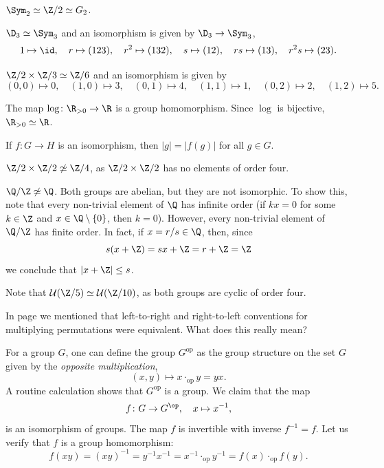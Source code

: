 \begin{example}
$\Sym_2\simeq\Z/2\simeq G_2$.
\end{example}

\begin{example}
$\D_3\simeq\Sym_3$ and an isomorphism is given by $\D_3\to\Sym_3$,
\[
1\mapsto \id,\quad
r\mapsto (123),\quad r^2\mapsto(132),\quad s\mapsto(12),\quad rs\mapsto(13),\quad r^2s\mapsto(23).
\]
\end{example}

\begin{example}
$\Z/2\times\Z/3\simeq\Z/6$ and an isomorphism is given by 
\[
(0,0)\mapsto 0,\quad (1,0)\mapsto 3,\quad
(0,1)\mapsto 4,\quad (1,1)\mapsto 1,\quad (0,2)\mapsto 2,\quad (1,2)\mapsto 5.
\]
\end{example}

\begin{example}
The map $\log\colon\R_{>0}\to\R$ is a group homomorphism. Since
$\log$ is bijective, 
$\R_{>0}\simeq\R$.
\end{example}

If $f\colon G\to H$ is an isomorphism, then
$|g|=|f(g)|$ for all $g\in G$. 

\begin{example}
\label{exa:order4}
$\Z/2\times\Z/2\not\simeq\Z/4$, as $\Z/2\times\Z/2$ has no elements of order four. 
\end{example}

\begin{example}
$\Q/\Z\not\simeq\Q$. Both groups are abelian, but they are not isomorphic. To show this, note that every non-trivial element of $\Q$ has infinite order (if $kx=0$ for some $k\in\Z$ and $x\in\Q\setminus\{0\}$, then
$k=0$). However, every non-trivial element of $\Q/\Z$ has finite order. In fact, if $x=r/s\in\Q$, then, since 
\[
s(x+\Z)=sx+\Z=r+\Z=\Z
\]
we conclude that $|x+\Z|\leq s$.
\end{example}

\begin{example}
\label{exa:U(Z/5)}
Note that $\mathcal{U}(\Z/5)\simeq\mathcal{U}(\Z/10)$, as
both groups are cyclic of order four. 
\end{example}

In page \pageref{convention:left-to-right} we mentioned that left-to-right and right-to-left 
conventions for multiplying permutations were equivalent. What does this really mean?

\begin{example}
\label{exa:op}
    For a group $G$, 
    one can define the group $G^{\operatorname{op}}$ as the group structure 
    on the set $G$ given by the \emph{opposite multiplication},  
    \[
    (x,y)\mapsto x\cdot_{\operatorname{op}}y=yx.
    \]
    A routine calculation shows that  
    $G^{\operatorname{op}}$ is a group. We claim that the map 
    \[
    f\colon G\to G^{\op},\quad x\mapsto x^{-1},
    \]
    is an isomorphism of groups. The map $f$ is invertible with inverse $f^{-1}=f$. 
    Let us verify that 
    $f$ is a group homomorphism:
    \[
    f(xy)=(xy)^{-1}=y^{-1}x^{-1}=x^{-1}\cdot_{\operatorname{op}}y^{-1}=f(x)\cdot_{\operatorname{op}}f(y).
    \]
\end{example}

